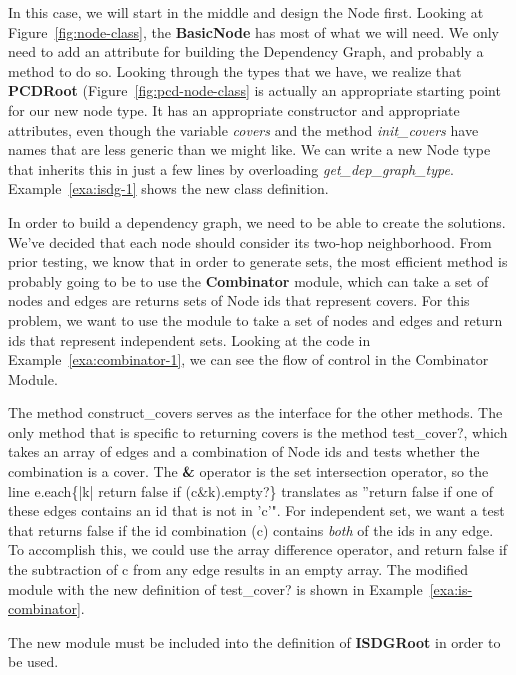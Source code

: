 In this case, we will start in the middle and design the Node first. Looking at Figure~\ref{fig:node-class}, the {\bfseries BasicNode} has most of what we will need. We only need to add an attribute for building the Dependency Graph, and probably a method to do so. Looking through the types that we have, we realize that {\bfseries PCDRoot} (Figure~\ref{fig:pcd-node-class} is actually an appropriate starting point for our new node type. It has an appropriate constructor and appropriate attributes, even though the variable {\em covers} and the method {\em init\_covers} have names that are less generic than we might like. We can write a new Node type that inherits this in just a few lines by overloading {\em get\_dep\_graph\_type}. Example~\ref{exa:isdg-1} shows the new class definition.



In order to build a dependency graph, we need to be able to create the solutions. We've decided that each node should consider its two-hop neighborhood. From prior testing, we know that in order to generate sets, the most efficient method is probably going to be to use the {\bfseries Combinator} module, which can take a set of nodes and edges are returns sets of Node ids that represent covers. For this problem, we want to use the module to take a set of nodes and edges and return ids that represent independent sets. Looking at the code in Example~\ref{exa:combinator-1}, we can see the flow of control in the Combinator Module. 

The method {\ttfamily construct\_covers} serves as the interface for the other methods. The only method that is specific to returning covers is the method {\ttfamily test\_cover?}, which takes an array of edges and a combination of Node ids and tests whether the combination is a cover. The {\bfseries \&} operator is the set intersection operator, so the line {\ttfamily e.each\{|k| return false if (c\&k).empty?\}} translates as ''return false if one of these edges contains an id that is not in 'c'". For independent set, we want a test that returns false if the id combination (c) contains {\em both} of the ids in any edge. To accomplish this, we could use the array difference operator, and return false if the subtraction of c from any edge results in an empty array. The modified module with the new definition of {\ttfamily test\_cover?} is shown in Example~\ref{exa:is-combinator}.  

The new module must be included into the definition of {\bf ISDGRoot} in order to be used.  

